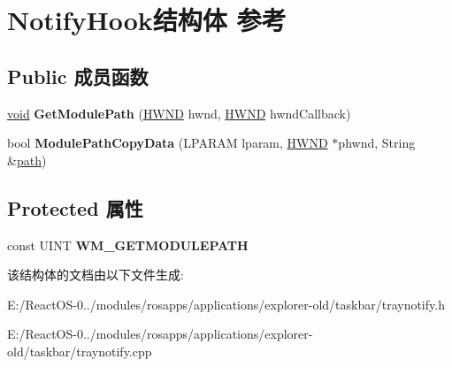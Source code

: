 \hypertarget{struct_notify_hook}{}\section{Notify\+Hook结构体 参考}
\label{struct_notify_hook}
\subsection*{Public 成员函数}
\begin{DoxyCompactItemize}
\item 
\mbox{\label{struct_notify_hook_ae633681b803a80cd028d9916a1a77f87}} 
\hyperlink{interfacevoid}{void} {\bfseries Get\+Module\+Path} (\hyperlink{interfacevoid}{H\+W\+ND} hwnd, \hyperlink{interfacevoid}{H\+W\+ND} hwnd\+Callback)
\item 
\mbox{\label{struct_notify_hook_a31079cae083511d39e6a97b3a9ff99e5}} 
bool {\bfseries Module\+Path\+Copy\+Data} (L\+P\+A\+R\+AM lparam, \hyperlink{interfacevoid}{H\+W\+ND} $\ast$phwnd, String \&\hyperlink{structpath}{path})
\end{DoxyCompactItemize}
\subsection*{Protected 属性}
\begin{DoxyCompactItemize}
\item 
\mbox{\label{struct_notify_hook_ae0b796f448391beb24b2d333af306436}} 
const U\+I\+NT {\bfseries W\+M\+\_\+\+G\+E\+T\+M\+O\+D\+U\+L\+E\+P\+A\+TH}
\end{DoxyCompactItemize}


该结构体的文档由以下文件生成\+:\begin{DoxyCompactItemize}
\item 
E\+:/\+React\+O\+S-\/0../modules/rosapps/applications/explorer-\/old/taskbar/traynotify.\+h\item 
E\+:/\+React\+O\+S-\/0../modules/rosapps/applications/explorer-\/old/taskbar/traynotify.\+cpp\end{DoxyCompactItemize}
